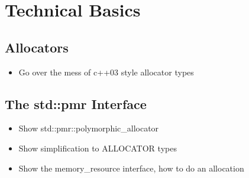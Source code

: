 \section{Technical Basics}

\subsection{Allocators}

\begin{itemize}
\item Go over the mess of c++03 style allocator types
\end{itemize}


\subsection{The std::pmr Interface}

\begin{itemize}
\item Show std::pmr::polymorphic\_allocator
\item Show simplification to ALLOCATOR types
\item Show the memory\_resource interface, how to do an allocation
\end{itemize}


